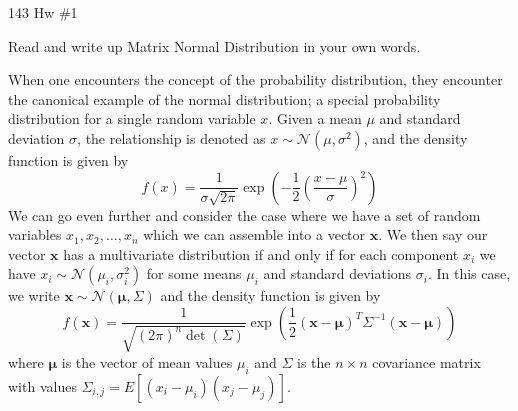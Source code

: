 \documentclass[12pt,letterpaper,boxed]{math_hw_pset}
\newcommand{\nn}{\mathbb{N}}
\renewcommand{\nn}{\mathcal{N}}
\begin{document}
\begin{center}
    143 Hw \#1
\end{center}

\begin{exercise}[Problem 1]
    Read and write up Matrix Normal Distribution in your own words.
\end{exercise}

\begin{solution}
    When one encounters the concept of the probability distribution, they encounter 
    the canonical example of the normal distribution; a special probability distribution 
    for a single random variable $x$. Given a mean $\mu$ and standard deviation 
    $\sigma$, the relationship is denoted as $x\sim \nn(\mu, \sigma^2)$,
    and the density function is given by 
    \[
        f(x) = \frac{1}{\sigma\sqrt{2\pi}}\exp\left(-\dfrac{1}{2}\left(\dfrac{x - \mu}{\sigma}\right)^2\right)
    \]
    We can go even further and consider the case where we have a set of random variables $x_1, x_2, \dots, x_n$ 
    which we can assemble into a vector $\bm{x}$. We then say 
    our vector $\bm{x}$ has a multivariate distribution if and only if 
    for each component $x_i$ we have $x_i \sim \nn(\mu_i, \sigma_i^2)$
    for some means $\mu_i$ and standard deviations $\sigma_i$.
    In this case,
    we write $\bm{x} \sim \nn(\bm{\mu}, \Sigma)$ and
    the density function is given by
    \[
        f(\bm{x})  = \frac{1}{\sqrt{(2\pi)^n\det(\Sigma)}}\exp\left(\frac{1}{2}(\bm{x} - \bm{\mu})^{T}\Sigma^{-1}(\bm{x} - \bm{\mu})  \right)        
    \]
    where $\bm{\mu}$ is the vector of mean values $\mu_i$ and $\Sigma$ is the $n\times n$ covariance matrix 
    with values $\Sigma_{i,j} = E[(x_i -\mu_i)(x_j-\mu_j)]$.


\end{solution}
\end{document}

